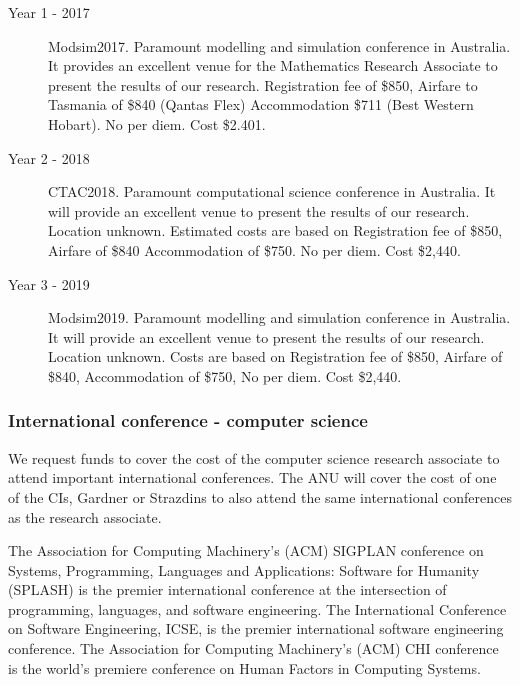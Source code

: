 \documentclass[a4paper,fontsize=12pt]{scrartcl}
\begin{document}
\begin{description}
\item[Year 1 - 2017] Modsim2017.
Paramount modelling and simulation conference in Australia. It provides an excellent venue for the Mathematics Research Associate to present the results of our research. 
Registration fee of \$850, 
Airfare to Tasmania of \$840 (Qantas Flex)
Accommodation \$711 (Best Western Hobart).  
No per diem. Cost \$2.401.



\item[Year 2 - 2018] CTAC2018.
Paramount computational science conference in Australia. It will provide an excellent venue to present the results of our research. Location unknown.
Estimated costs are based on 
Registration fee of \$850, 
Airfare of \$840
Accommodation of \$750.
No per diem. Cost \$2,440.

\item[Year 3 - 2019] Modsim2019.
Paramount modelling and simulation conference in Australia. It will provide an excellent venue to present the results of our research. Location unknown.
Costs are based on 
Registration fee of \$850, 
Airfare of \$840,
Accommodation of \$750,
No per diem. Cost \$2,440.




\end{description}

\subsubsection*{International conference - computer science}

We request funds to cover the cost of the computer science research associate to attend important international conferences.    The ANU will cover the cost of one of the CIs, Gardner or Strazdins to also attend the same international conferences as the research associate. 

The  Association for Computing Machinery’s (ACM) SIGPLAN conference on Systems, Programming, Languages and Applications: Software for Humanity (SPLASH) is the premier international conference at the intersection of programming, languages, and software engineering.
The International Conference on Software Engineering, ICSE, is the premier international software engineering conference.
The Association for Computing Machinery’s (ACM) CHI conference is the world's premiere conference on Human Factors in Computing Systems.
\end{document}
